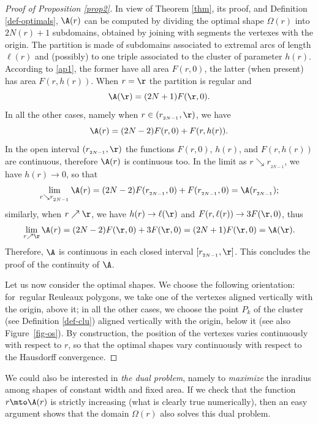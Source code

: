 \begin{proof}[Proof of Proposition \ref{prop2}] In view of Theorem \ref{thm}, its proof, and Definition \ref{def-optimals}, $\A(r)$ can be computed by dividing the optimal shape $\Omega(r)$ into $2N(r)+1$ subdomains, obtained by joining with segments the vertexes with the origin. The partition is made of subdomains associated to extremal arcs of length $\ell(r)$ and (possibly) to one triple associated to the cluster of parameter $h(r)$. According to \eqref{ap1}, the former have all area $F(r,0)$, the latter (when present) has area $F(r,h(r))$.
When $r=\r$ the partition is regular and
\[
\A(\r) = (2N+1)F(\r,0).
\]
In all the other cases, namely when $r\in (r_{_{2N-1}},\r)$, we have
\[
\A(r)=(2N-2)F(r,0) + F(r,h(r)).
\]
In the open interval $(r_{_{2N-1}}, \r)$ the functions $F(r,0)$, $h(r)$, and $F(r,h(r))$ are continuous, therefore $\A(r)$ is continuous too. In the limit as $r \searrow r_{_{2N-1}}$, we have $h(r)\to 0$, so that
\[
\lim_{r\searrow r_{_{2N-1}}}\A(r)= (2N-2)F(r_{_{2N-1}},0) + F(r_{_{2N-1}},0) = \A(r_{_{2N-1}});
\]
similarly, when $r\nearrow \r$, we have $h(r)\to\ell(\r)$ and $F(r,\ell(r))\to 3 F(\r,0)$, thus
\[
\lim_{r\nearrow \r}\A(r)=(2N-2)F(\r,0) + 3F(\r,0)=(2N+1)F(\r,0) = \A(\r).
\]
Therefore, $\A$ is continuous in each closed interval $[r_{_{2N-1}},\r]$. This concludes the proof of the continuity of $\A$.

Let us now consider the optimal shapes. We choose the following orientation: for~regular Reuleaux polygons, we take one of the vertexes aligned vertically with the origin, above it; in all the other cases, we choose the point $P_k$ of the cluster (see Definition \ref{def-clu}) aligned vertically with the origin, below it (see also Figure~\ref{fig-os}). By construction, the position of the vertexes varies continuously with respect to $r$, so that the optimal shapes vary continuously with respect to the Hausdorff convergence.
\end{proof}

\begin{remark}
We could also be interested in \emph{the dual problem}, namely to \emph{maximize} the inradius among shapes of constant width and fixed area. If we check that the function $r\mto \A(r)$ is strictly increasing
(what is clearly true numerically), then an easy argument shows that the domain $\Omega(r)$ also
solves this dual problem.
\end{remark}

